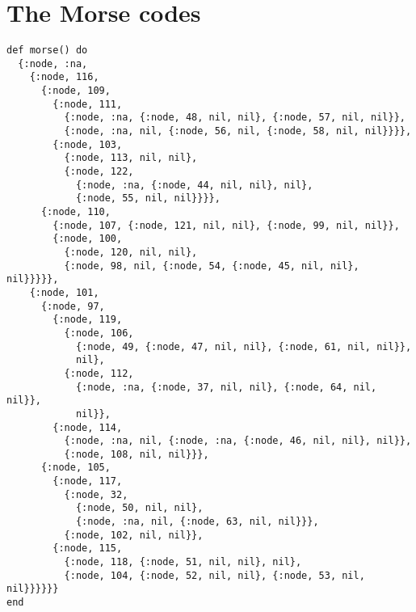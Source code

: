 \documentclass[a4paper,11pt]{article}
\begin{document}
\pagebreak

\section*{The Morse codes}

\begin{verbatim}
def morse() do
  {:node, :na,
    {:node, 116,
      {:node, 109,
        {:node, 111,
          {:node, :na, {:node, 48, nil, nil}, {:node, 57, nil, nil}},
          {:node, :na, nil, {:node, 56, nil, {:node, 58, nil, nil}}}},
        {:node, 103,
          {:node, 113, nil, nil},
          {:node, 122,
            {:node, :na, {:node, 44, nil, nil}, nil},
            {:node, 55, nil, nil}}}},
      {:node, 110,
        {:node, 107, {:node, 121, nil, nil}, {:node, 99, nil, nil}},
        {:node, 100,
          {:node, 120, nil, nil},
          {:node, 98, nil, {:node, 54, {:node, 45, nil, nil}, nil}}}}},
    {:node, 101,
      {:node, 97,
        {:node, 119,
          {:node, 106,
            {:node, 49, {:node, 47, nil, nil}, {:node, 61, nil, nil}},
            nil},
          {:node, 112,
            {:node, :na, {:node, 37, nil, nil}, {:node, 64, nil, nil}},
            nil}},
        {:node, 114,
          {:node, :na, nil, {:node, :na, {:node, 46, nil, nil}, nil}},
          {:node, 108, nil, nil}}},
      {:node, 105,
        {:node, 117,
          {:node, 32,
            {:node, 50, nil, nil},
            {:node, :na, nil, {:node, 63, nil, nil}}},
          {:node, 102, nil, nil}},
        {:node, 115,
          {:node, 118, {:node, 51, nil, nil}, nil},
          {:node, 104, {:node, 52, nil, nil}, {:node, 53, nil, nil}}}}}}
end
\end{verbatim}

\pagebreak
\end{document}
